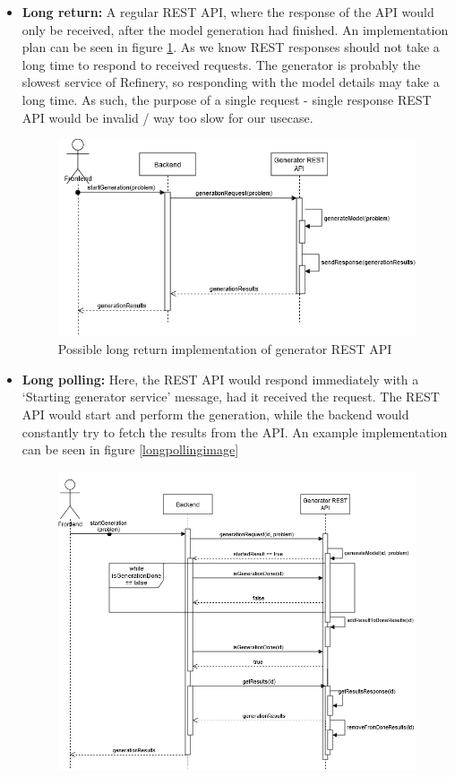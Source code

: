 \begin{itemize}
        \item \textbf{Long return:}
		A regular REST API, where the response of the API would only be received, after
		the model generation had finished. An implementation plan can be seen in figure \ref{longreturnimage}. 
		As we know REST responses should not take a long time to respond to received requests.
		The generator is probably the slowest service of Refinery, so responding with the model details may take a long time.
		As such, the purpose of a single request - single response REST API would be invalid / way too slow for our usecase.
		\begin{figure}
			\begin{center}
				\includegraphics[scale=0.6]{include/imgs/rest_long_return.png}
				\caption{Possible long return implementation of generator REST API}
				\label{longreturnimage}
			\end{center}
		\end{figure}
		\item \textbf{Long polling:}
		Here, the REST API would respond immediately with a `Starting generator service' message, had it received the request.
		The REST API would start and perform the generation, while the backend would constantly try to fetch the results from the API.
		An example implementation can be seen in figure \ref{longpollingimage}
		\begin{figure}
			\begin{center}
				\includegraphics[scale=0.5]{include/imgs/rest_long_poll.png}

\end{center}
\end{figure}
\end{itemize}
